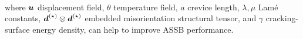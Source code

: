 \documentclass[25pt, a0paper,
portrait,
margin=2mm, 
innermargin=2mm, 
blockverticalspace=7mm, %
colspace=2mm, %
subcolspace=0mm]{tikzposter}
\makeatletter
\newcommand*{\inputfig}[3][htb]{{
    \def\fps@figure{#1}
    \def\DIR{#2}
    \def\LABEL{#3}
    \graphicspath{{\DIR/}}
    
}}
\makeatother
\begin{document}
{\begin{minipage}{0.56\textwidth}
\begin{mdframed}
\begin{align*}
			\end{align*}
			where 
			${\boldsymbol{\mathnormal u}}$ displacement field, 
			$\theta$ temperature field, 
			$a$ crevice length,
			$\lambda, \mu$ Lam\'{e} constants,
			${\boldsymbol{\mathnormal d}}^{(\star)}\otimes{\boldsymbol{\mathnormal d}}^{(\star)}$ embedded misorientation structural tensor,
			and 
			$\gamma$ cracking-surface energy density,
			can help 
			to improve ASSB performance.
		\end{mdframed}
	\end{minipage}%
	\hfill
	\begin{minipage}{0.44\textwidth}
		\begin{center}
			\inputfig{floats/routine_woTV_spectral_python}{routine_woTV_spectral_python}
			\inputfig{floats/dendrite_SESSE}{dendrite_SESSE}
		\end{center}
	\end{minipage}
	\vspace{-0.3cm}
}
\end{document}
